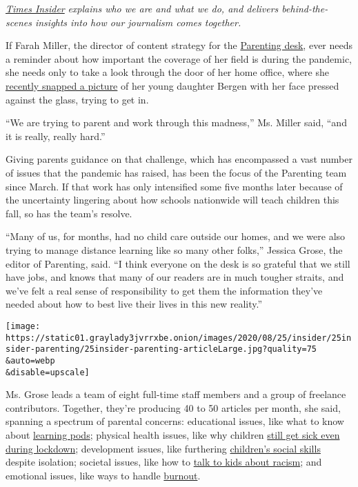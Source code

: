 \href{https://www.nytimes3xbfgragh.onion/series/times-insider}{\emph{Times
Insider}} \emph{explains who we are and what we do, and delivers
behind-the-scenes insights into how our journalism comes together.}

If Farah Miller, the director of content strategy for the
\href{https://www.nytimes3xbfgragh.onion/section/parenting}{Parenting
desk}, ever needs a reminder about how important the coverage of her
field is during the pandemic, she needs only to take a look through the
door of her home office, where she
\href{https://www.instagram.com/stories/highlights/17847143816283838/}{recently
snapped a picture} of her young daughter Bergen with her face pressed
against the glass, trying to get in.

``We are trying to parent and work through this madness,'' Ms. Miller
said, ``and it is really, really hard.''

Giving parents guidance on that challenge, which has encompassed a vast
number of issues that the pandemic has raised, has been the focus of the
Parenting team since March. If that work has only intensified some five
months later because of the uncertainty lingering about how schools
nationwide will teach children this fall, so has the team's resolve.

``Many of us, for months, had no child care outside our homes, and we
were also trying to manage distance learning like so many other folks,''
Jessica Grose, the editor of Parenting, said. ``I think everyone on the
desk is so grateful that we still have jobs, and knows that many of our
readers are in much tougher straits, and we've felt a real sense of
responsibility to get them the information they've needed about how to
best live their lives in this new reality.''

\texttt{[image: https://static01.graylady3jvrrxbe.onion/images/2020/08/25/insider/25insider-parenting/25insider-parenting-articleLarge.jpg?quality=75\\\&auto=webp\\\&disable=upscale]}

Ms. Grose leads a team of eight full-time staff members and a group of
freelance contributors. Together, they're producing 40 to 50 articles
per month, she said, spanning a spectrum of parental concerns:
educational issues, like what to know about
\href{https://www.nytimes3xbfgragh.onion/2020/07/22/parenting/school-pods-coronavirus.html}{learning
pods}; physical health issues, like why children
\href{https://www.nytimes3xbfgragh.onion/2020/06/24/parenting/virus-kids-sick-quarantine-infection.html}{still
get sick even during lockdown}; development issues, like furthering
\href{https://www.nytimes3xbfgragh.onion/2020/06/18/parenting/kids-social-needs-quarantine.html}{children's
social skills} despite isolation; societal issues, like how to
\href{https://www.nytimes3xbfgragh.onion/2020/06/03/parenting/kids-books-racism.html}{talk
to kids about racism}; and emotional issues, like ways to handle
\href{https://www.nytimes3xbfgragh.onion/2020/06/23/parenting/parental-burnout-coronavirus.html?searchResultPosition=3}{burnout}.


